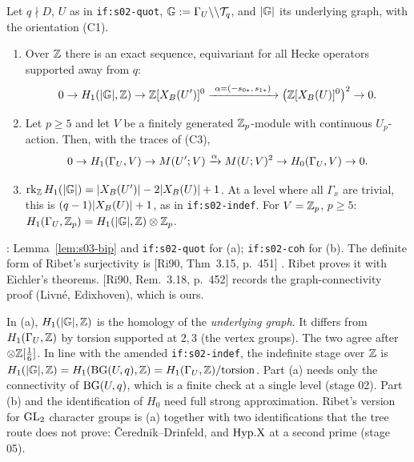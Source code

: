 \begin{theorem}\label{thm:s03-ribet}
Let $q\nmid D$, $U$ as in \texttt{if:s02-quot}, $\mathbb{G}:=\Gamma_U\backslash\backslash\mathcal{T}_q$, and $|\mathbb{G}|$ its underlying graph, with the orientation (C1).
\begin{enumerate}[label=(\alph*)]
\item Over $\mathbb{Z}$ there is an exact sequence, equivariant for all Hecke operators supported away from $q$:
  \[0\to H_1(|\G|,\Z)\to\Z[\XB{U'}]^0\xrightarrow{\ \alpha=(-s_{0*},\,s_{1*})\ }\big(\Z[\XB U]^0\big)^{2}\to0.\]
\item Let $p\ge5$ and let $V$ be a finitely generated $\mathbb{Z}_p$-module with continuous $U_p$-action. Then, with the traces of (C3),
  \[0\to H_1(\Gamma_U,V)\to M(U';V)\xrightarrow{\alpha}M(U;V)^{2}\to H_0(\Gamma_U,V)\to0.\]
\item $\operatorname{rk}_{\mathbb{Z}} H_1(|\mathbb{G}|)=|X_B(U')|-2|X_B(U)|+1$. At a level where all $\Gamma_x$ are trivial, this is $(q-1)|X_B(U)|+1$, as in
  \texttt{if:s02-indef}. For $V=\mathbb{Z}_p$, $p\ge5$: $H_1(\Gamma_U,\mathbb{Z}_p)=H_1(|\mathbb{G}|,\mathbb{Z})\otimes\mathbb{Z}_p$.
\end{enumerate}
\stpmc: Lemma~\ref{lem:s03-bip} and \texttt{if:s02-quot} for (a); \texttt{if:s02-coh} for (b). The definite form of Ribet's
surjectivity is [Ri90, Thm~3.15, p.~451] 
\stcited. Ribet proves it with Eichler's theorems. [Ri90, Rem.~3.18, p.~452] records the graph-connectivity proof (Livn\'e,
Edixhoven), which is ours.
\end{theorem}

\begin{remark}
In (a), $H_1(|\mathbb{G}|,\mathbb{Z})$ is the homology of the \emph{underlying graph}. It differs from $H_1(\Gamma_U,\mathbb{Z})$ by torsion supported at $2,3$
(the vertex groups). The two agree after $\otimes\mathbb{Z}[\frac16]$. In line with the amended \texttt{if:s02-indef}, the
indefinite stage over $\mathbb{Z}$ is $H_1(|\mathbb{G}|,\mathbb{Z})=H_1(\mathrm{BG}(U,q),\mathbb{Z})=H_1(\Gamma_U,\mathbb{Z})/\mathrm{torsion}$. Part (a) needs only the connectivity of
$\mathrm{BG}(U,q)$, which is a finite check at a single level (stage 02). Part (b) and the identification of $H_0$ need full strong approximation. Ribet's version for $\mathrm{GL}_2$ character groups is (a) together with
two identifications that the tree route does not prove: Čerednik--Drinfeld, and $\mathrm{Hyp.X}$ at a second prime (stage 05).
\end{remark}

